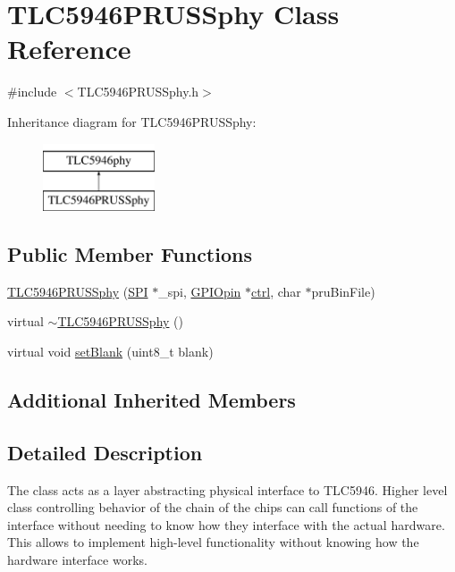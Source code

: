 \hypertarget{class_t_l_c5946_p_r_u_s_sphy}{\section{T\-L\-C5946\-P\-R\-U\-S\-Sphy Class Reference}
\label{class_t_l_c5946_p_r_u_s_sphy}
}


{\ttfamily \#include $<$T\-L\-C5946\-P\-R\-U\-S\-Sphy.\-h$>$}

Inheritance diagram for T\-L\-C5946\-P\-R\-U\-S\-Sphy\-:\begin{figure}[H]
\begin{center}
\leavevmode
\includegraphics[height=2.000000cm]{class_t_l_c5946_p_r_u_s_sphy}
\end{center}
\end{figure}
\subsection*{Public Member Functions}
\begin{DoxyCompactItemize}
\item 
\hyperlink{class_t_l_c5946_p_r_u_s_sphy_a654892071d1aee78428b4c142151574d}{T\-L\-C5946\-P\-R\-U\-S\-Sphy} (\hyperlink{class_s_p_i}{S\-P\-I} $\ast$\-\_\-spi, \hyperlink{class_g_p_i_opin}{G\-P\-I\-Opin} $\ast$\hyperlink{class_t_l_c5946phy_ad593ca4b96986ce8e40c833ed5ed3769}{ctrl}, char $\ast$pru\-Bin\-File)
\item 
virtual \hyperlink{class_t_l_c5946_p_r_u_s_sphy_afe139acf9d6f593597a900e4311dab51}{$\sim$\-T\-L\-C5946\-P\-R\-U\-S\-Sphy} ()
\item 
virtual void \hyperlink{class_t_l_c5946_p_r_u_s_sphy_a28d5f0a3fb62b085dd7795373b9b4b85}{set\-Blank} (uint8\-\_\-t blank)
\end{DoxyCompactItemize}
\subsection*{Additional Inherited Members}


\subsection{Detailed Description}
The class acts as a layer abstracting physical interface to T\-L\-C5946. Higher level class controlling behavior of the chain of the chips can call functions of the interface without needing to know how they interface with the actual hardware. This allows to implement high-\/level functionality without knowing how the hardware interface works. 

